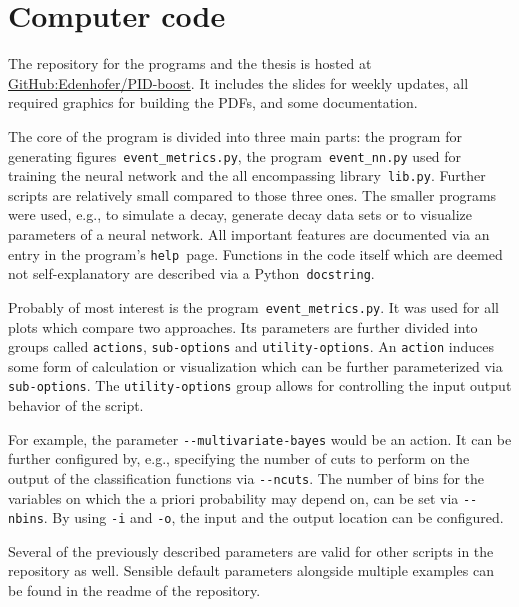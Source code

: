 \chapter{Computer code}
\label{chap:computer_code}

The repository for the programs and the thesis is hosted at \href{https://github.com/Edenhofer/PID-boost}{GitHub:Edenhofer/PID-boost}. It includes the slides for weekly updates, all required graphics for building the PDFs, and some documentation.

The core of the program is divided into three main parts: the program for generating figures~\lstinline|event_metrics.py|, the program~\lstinline|event_nn.py| used for training the neural network and the all encompassing library~\lstinline|lib.py|. Further scripts are relatively small compared to those three ones. The smaller programs were used, e.g., to simulate a decay, generate decay data sets or to visualize parameters of a neural network. All important features are documented via an entry in the program's \lstinline|help|~page. Functions in the code itself which are deemed not self-explanatory are described via a Python~\lstinline|docstring|.

Probably of most interest is the program~\lstinline|event_metrics.py|. It was used for all plots which compare two approaches. Its parameters are further divided into groups called \lstinline|actions|, \lstinline|sub-options| and \lstinline|utility-options|. An \lstinline|action| induces some form of calculation or visualization which can be further parameterized via \lstinline|sub-options|. The \lstinline|utility-options| group allows for controlling the input output behavior of the script.

For example, the parameter \lstinline|--multivariate-bayes| would be an action. It can be further configured by, e.g., specifying the number of cuts to perform on the output of the classification functions via \lstinline|--ncuts|. The number of bins for the variables on which the a priori probability may depend on, can be set via \lstinline|--nbins|. By using \lstinline|-i| and \lstinline|-o|, the input and the output location can be configured.

Several of the previously described parameters are valid for other scripts in the repository as well. Sensible default parameters alongside multiple examples can be found in the readme of the repository.
